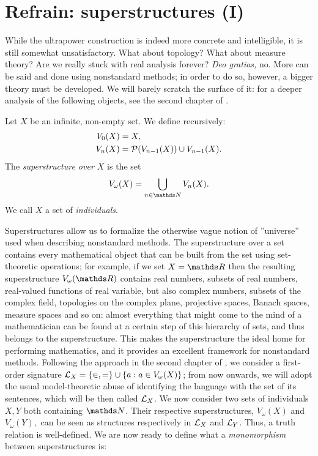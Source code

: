 \documentclass[draft.tex]{subfiles}
\begin{document}
\section{Refrain: superstructures (I)}
While the ultrapower construction is indeed more concrete and intelligible, it is still somewhat unsatisfactory. What about topology? What about measure theory? Are we really stuck with real analysis forever? \textit{Deo gratias,} no. More can be said and done using nonstandard methods; in order to do so, however, a bigger theory must be developed. We will barely scratch the surface of it: for a deeper analysis of the following objects, see the second chapter of \cite{introductionloeb}.
\begin{definition}
Let $X$ be an infinite, non-empty set. We define recursively:
\begin{align*}
    V_0(X) &= X, \\
    V_n(X) &= \mathcal{P}(V_{n-1}(X)) \cup V_{n-1}(X).
\end{align*}
The \emph{superstructure over $X$} is the set
\begin{equation*}
    V_{\omega}(X) = \bigcup\limits_{n \in \NN} V_n(X).
\end{equation*}
We call $X$ a set of \emph{individuals}.
\end{definition}
Superstructures allow us to formalize the otherwise vague notion of ''universe'' used when describing nonstandard methods. The superstructure over a set contains every mathematical object that can be built from the set using set-theoretic operations; for example, if we set $X = \RR$ then the resulting superstructure $V_{\omega}(\RR)$ contains real numbers, subsets of real numbers, real-valued functions of real variable, but also complex numbers, subsets of the complex field, topologies on the complex plane, projective spaces, Banach spaces, measure spaces and so on: almost everything that might come to the mind of a mathematician can be found at a certain step of this hierarchy of sets, and thus belongs to the superstructure. This makes the superstructure the ideal home for performing mathematics, and it provides an excellent framework for nonstandard methods. Following the approach in the second chapter of \cite{introductionloeb}, we consider a first-order signature $\mathcal{L}_X = \{\in, =\}\cup\{a: a \in V_{\omega}(X)\}$; from now onwards, we will adopt the usual model-theoretic abuse of identifying the language with the set of its sentences, which will be then called $\mathcal{L}_X$. We now consider two sets of individuals $X, Y$ both containing $\NN$. Their respective superstructures, $V_{\omega}(X)$ and $V_{\omega}(Y),$ can be seen as structures respectively in $\mathcal{L}_X$ and $\mathcal{L}_Y$. Thus, a truth relation is well-defined. We are now ready to define what a \emph{monomorphism} between superstructures is:
\end{document}
